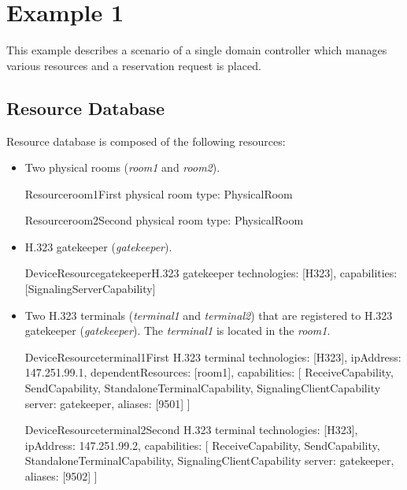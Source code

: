 \section{Example 1}

This example describes a scenario of a single domain controller which manages various resources and a reservation request is placed.

\subsection{Resource Database}

Resource database is composed of the following resources:
\begin{itemize}
\item Two physical rooms (\emph{room1} and \emph{room2}).

\begin{EntityExample}{Resource}{room1}{First physical room}
type: PhysicalRoom
\end{EntityExample}

\begin{EntityExample}{Resource}{room2}{Second physical room}
type: PhysicalRoom
\end{EntityExample}

\item H.323 gatekeeper (\emph{gatekeeper}).

\begin{EntityExample}{DeviceResource}{gatekeeper}{H.323 gatekeeper}
technologies: [H323], 
capabilities: [SignalingServerCapability]
\end{EntityExample}

\item Two H.323 terminals (\emph{terminal1} and \emph{terminal2}) that are
  registered to H.323 gatekeeper (\emph{gatekeeper}). The \emph{terminal1} is
  located in the \emph{room1}.
  
\begin{EntityExample}{DeviceResource}{terminal1}{First H.323 terminal}
technologies: [H323], 
ipAddress: 147.251.99.1,
dependentResources: [room1],
capabilities: [
  ReceiveCapability, SendCapability,
  StandaloneTerminalCapability,
  SignalingClientCapability {server: gatekeeper, aliases: [9501]}
]
\end{EntityExample}

\begin{EntityExample}{DeviceResource}{terminal2}{Second H.323 terminal}
technologies: [H323], 
ipAddress: 147.251.99.2,
capabilities: [
  ReceiveCapability, SendCapability,
  StandaloneTerminalCapability,
  SignalingClientCapability {server: gatekeeper, aliases: [9502]}
]
\end{EntityExample}


\end{itemize}
